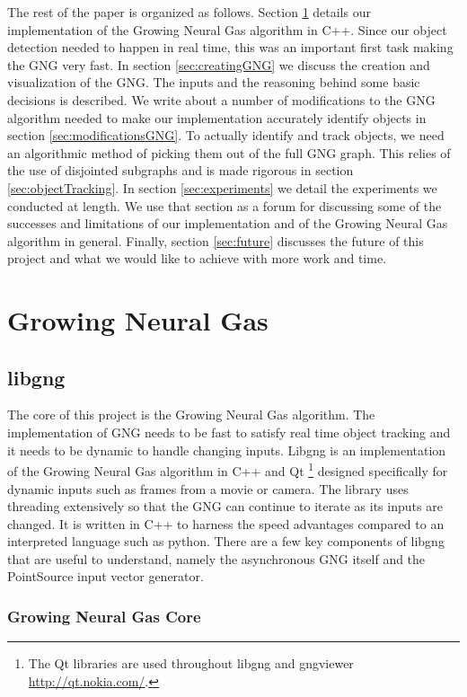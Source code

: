 \documentclass{article}
\renewcommand{\|}{\origbar} %
\begin{document}
The rest of the paper is organized as follows. Section \ref{sec:GNG} details our implementation of the Growing Neural Gas algorithm in C++. Since our object detection needed to happen in real time, this was an important first task making the GNG very fast. In section \ref{sec:creatingGNG} we discuss the creation and visualization of the GNG. The inputs and the reasoning behind some basic decisions is described. We write about a number of modifications to the GNG algorithm needed to make our implementation accurately identify objects in section \ref{sec:modificationsGNG}. To actually identify and track objects, we need an algorithmic method of picking them out of the full GNG graph. This relies of the use of disjointed subgraphs and is made rigorous in section \ref{sec:objectTracking}. In section \ref{sec:experiments} we detail the experiments we conducted at length. We use that section as a forum for discussing some of the successes and limitations of our implementation and of the Growing Neural Gas algorithm in general. Finally, section \ref{sec:future} discusses the future of this project and what we would like to achieve with more work and time.

\section{Growing Neural Gas}
\label{sec:GNG}

\subsection{libgng}

The core of this project is the Growing Neural Gas algorithm. The implementation of GNG needs to be fast to satisfy real time object tracking and it needs to be dynamic to handle changing inputs. Libgng is an implementation of the Growing Neural Gas algorithm in C++ and Qt \footnote{The Qt libraries are used throughout libgng and gngviewer \url{http://qt.nokia.com/}.} designed specifically for dynamic inputs such as frames from a movie or camera. The library uses threading extensively so that the GNG can continue to iterate as its inputs are changed. It is written in C++ to harness the speed advantages compared to an interpreted language such as python. There are a few key components of libgng that are useful to understand, namely the asynchronous GNG itself and the PointSource input vector generator.

\subsubsection{Growing Neural Gas Core}
\end{document}
